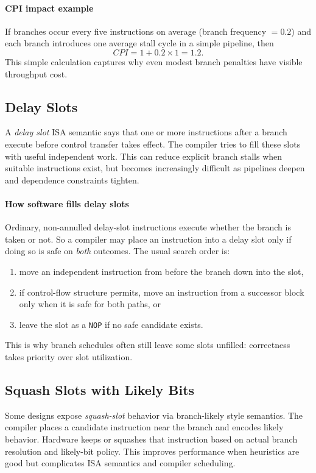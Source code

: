 \paragraph{CPI impact example}\label{par:auto-025}
If branches occur every five instructions on average (branch frequency $=0.2$) and each branch introduces one average stall cycle in a simple pipeline, then
\begin{equation}\label{eq:auto-044}
    CPI = 1 + 0.2\times 1 = 1.2.
\end{equation}
This simple calculation captures why even modest branch penalties have visible throughput cost.

\subsection{Delay Slots}\label{subsec:auto-007}
A \textit{delay slot} ISA semantic says that one or more instructions after a branch execute before control transfer takes effect.
The compiler tries to fill these slots with useful independent work.
This can reduce explicit branch stalls when suitable instructions exist, but becomes increasingly difficult as pipelines deepen and dependence constraints tighten.

\paragraph{How software fills delay slots}\label{par:auto-025g}
Ordinary, non-annulled delay-slot instructions execute whether the branch is taken or not.
So a compiler may place an instruction into a delay slot only if doing so is safe on \emph{both} outcomes.
The usual search order is:
\begin{enumerate}
    \item move an independent instruction from before the branch down into the slot,
    \item if control-flow structure permits, move an instruction from a successor block only when it is safe for both paths, or
    \item leave the slot as a \texttt{NOP} if no safe candidate exists.
\end{enumerate}
This is why branch schedules often still leave some slots unfilled: correctness takes priority over slot utilization.

\subsection{Squash Slots with Likely Bits}\label{subsec:auto-008}
Some designs expose \textit{squash-slot} behavior via branch-likely style semantics.
The compiler places a candidate instruction near the branch and encodes likely behavior.
Hardware keeps or squashes that instruction based on actual branch resolution and likely-bit policy.
This improves performance when heuristics are good but complicates ISA semantics and compiler scheduling.

